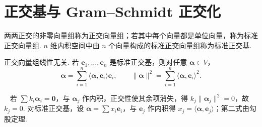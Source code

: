 \documentclass[lang=cn,10.5pt,scheme=chinese,toc=twocol,section,chinesefont=nofont,
twoside,citestyle=gb7714-2015,bibstyle=gb7714-2015]{elegantbook}
\DeclareRobustCommand{\textbf}[1]{{\lnsemiboldlatin\lnsemiboldcjk #1}}
\newcommand{\vv}[1]{\boldsymbol{#1}}
\newcommand{\zero}{\boldsymbol{0}}          %
\numberwithin{equation}{section}   %
\newcommand*{\lnlabel}[1]{{\sffamily\bfseries\color{black}#1}}
\renewenvironment{proof}{%
	\par\noindent\lnlabel{\proofname}\;\ \color{black!90}\cfs}{\par}
\begin{document}
\section{正交基与 Gram–Schmidt 正交化}\label{sec:gramschmidt}

\begin{definition}
  两两正交的非零向量组称为\textbf{正交向量组}；若其中每个向量都是单位向量，称为\textbf{标准正交向量组}. $n$ 维内积空间中由 $n$ 个向量构成的标准正交向量组称为\textbf{标准正交基}.
\end{definition}

\begin{proposition}
  \label{prop:orthindep}
  正交向量组线性无关. 若 $\vv e_1,\ldots,\vv e_n$ 是标准正交基，则对任意 $\vv\alpha\in V$，
  \[\vv\alpha=\sum_{i=1}^n\langle\vv\alpha,\vv e_i\rangle\vv e_i,\qquad \|\vv\alpha\|^2=\sum_{i=1}^n\langle\vv\alpha,\vv e_i\rangle^2.\]
\end{proposition}
\begin{proof}
  若 $\sum k_i\vv\alpha_i=\zero$，与 $\vv\alpha_j$ 作内积，正交性使其余项消失，得 $k_j\|\vv\alpha_j\|^2=0$，故 $k_j=0$. 对标准正交基，设 $\vv\alpha=\sum x_i\vv e_i$，与 $\vv e_j$ 作内积得 $x_j=\langle\vv\alpha,\vv e_j\rangle$；第二式由勾股定理.
\end{proof}
\end{document}
